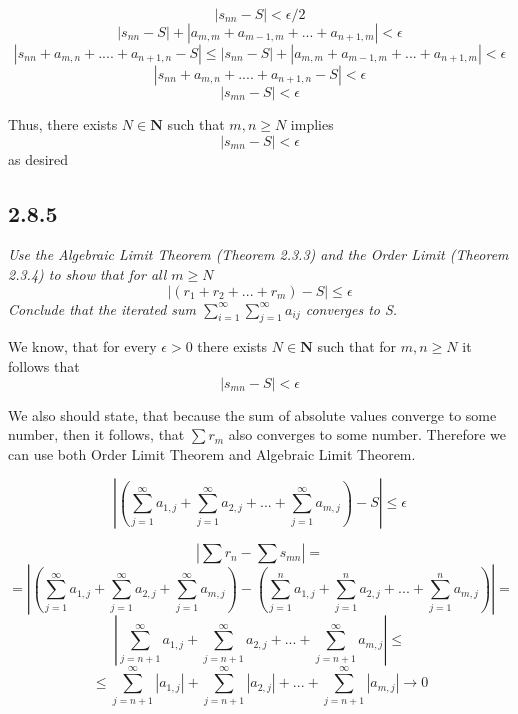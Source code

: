 \documentclass[11pt,oneside,titlepage]{book}
\begin{document}
$$|s_{nn} - S| < \epsilon/2$$
$$|s_{nn} - S| + |a_{m,m} + a_{m - 1, m} + ... + a_{n + 1,m}| < \epsilon$$
$$|s_{nn} + a_{m, n} + .... + a_{n + 1, n} - S| \leq |s_{nn} - S| + |a_{m,m} + a_{m - 1, m} + ... + a_{n + 1,m}| <  \epsilon$$
$$|s_{nn} + a_{m, n} + .... + a_{n + 1, n} - S| < \epsilon$$
$$|s_{mn}  - S| < \epsilon$$

Thus, there exists $N \in \textbf{N}$ such that $m, n \geq N$ implies
$$|s_{mn} - S| < \epsilon$$
as desired

\subsection*{2.8.5}
\textit{Use the Algebraic Limit Theorem (Theorem 2.3.3) and the Order Limit
  (Theorem 2.3.4) to show that for all $m \geq N$}
$$|(r_1 + r_2 + ... + r_m) - S| \leq  \epsilon$$
\textit{Conclude that the iterated sum
  $\sum_{i=1}^{\infty}\sum_{j=1}^{\infty} a_{ij}$ converges to S.}

We know, that for every $\epsilon > 0$  there exists $N \in \textbf{N}$ such
that for $m,n \geq N$ it follows that
$$|s_{mn} - S| < \epsilon$$

We also should state, that because the sum of absolute values converge
to some number, then it follows, that $\sum r_m$ also converges to some number.
Therefore we can use both Order Limit Theorem and Algebraic Limit Theorem.

$$\left|\left(\sum_{j = 1}^{\infty}a_{1,j} + \sum_{j = 1}^{\infty}a_{2,j} + ... + \sum_{j = 1}^{\infty}a_{m,j}\right) - S\right| \leq  \epsilon$$



$$\left|\sum r_n - \sum s_{mn}\right| = $$
$$ = \left|(\sum_{j=1}^{\infty} a_{1,j} + \sum_{j=1}^{\infty} a_{2,j} + \sum_{j=1}^{\infty} a_{m,j})
  - (\sum_{j=1}^{n} a_{1,j} + \sum_{j=1}^{n} a_{2,j} + ... + \sum_{j=1}^{n} a_{m,j})\right| = $$
$$\left|\sum_{j = n + 1}^{\infty} a_{1,j} + \sum_{j = n + 1}^{\infty} a_{2,j} + ...
  + \sum_{j = n + 1}^{\infty} a_{m,j} \right| \leq $$
$$
\leq \sum_{j = n + 1}^{\infty} |a_{1,j}| + \sum_{j = n + 1}^{\infty} |a_{2,j}| + ...
+ \sum_{j = n + 1}^{\infty} |a_{m,j}|  \to 0
$$
\end{document}
